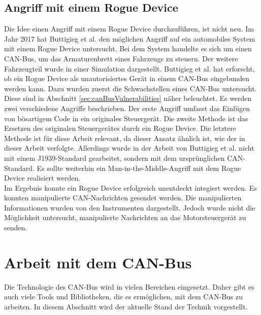 \subsection{Angriff mit einem Rogue Device}
Die Idee einen Angriff mit einem Rogue Device durchzuführen, ist nicht neu. Im Jahr 2017 hat Buttigieg et al. \cite{Buttigieg2017}
den möglichen Angriff auf ein automobiles System mit einem Rogue Device untersucht. Bei dem System handelte es sich um einen
CAN-Bus, um das Armaturenbrett eines Fahrzeugs zu steuern. Der weitere Fahrzeugteil wurde in einer Simulation dargestellt.
Buttigieg et al. hat erforscht, ob ein Rogue Device als unautorisiertes 
Gerät in einem CAN-Bus eingebunden werden kann. 
Dazu wurden zuerst die Schwachstellen eines CAN-Bus untersucht. Diese
sind in Abschnitt \ref{sec:canBusVulnerabilities} näher beleuchtet. Es werden zwei verschiedene Angriffe beschrieben.
Der erste Angriff umfasst das Einfügen von bösartigem Code in ein originales Steuergerät. Die zweite Methode ist das Ersetzen
des originalen Steuergerätes durch ein Rogue Device. Die letztere Methode ist für diese Arbeit relevant, da dieser Ansatz
ähnlich ist, wie der in dieser Arbeit verfolgte. Allerdings wurde in der Arbeit von Buttigieg et al. nicht mit einem
J1939-Standard gearbeitet, sondern mit dem ursprünglichen CAN-Standard. Es sollte weiterhin ein Man-in-the-Middle-Angriff
mit dem Rogue Device realisiert werden. \\
Im Ergebnis konnte ein Rogue Device erfolgreich unentdeckt integiert werden. Es konnten manipulierte CAN-Nachrichten gesendet werden.
Die manipulierten Informationen wurden von den Instrumenten dargestellt. Jedoch wurde nicht die Möglichkeit untersucht, manipulierte
Nachrichten an das Motorsteuergerät zu senden.


\section{Arbeit mit dem CAN-Bus}
Die Technologie des CAN-Bus wird in vielen Bereichen eingesetzt.
Daher gibt es auch viele Tools und Bibliotheken, die es ermöglichen, mit dem CAN-Bus zu arbeiten.
In diesem Abschnitt wird der aktuelle Stand der Technik vorgestellt.

